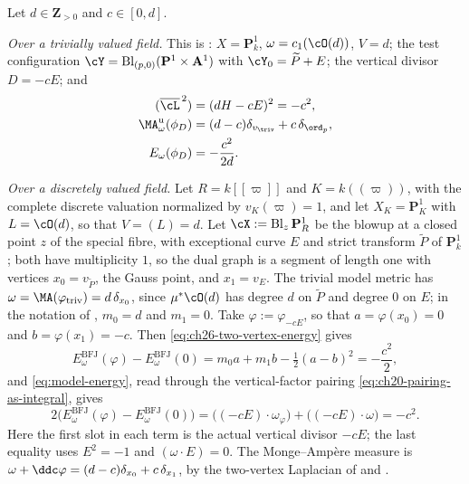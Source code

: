 \begin{example}
\label{ex:ch46-same-number-twice}
Let $d\in\mathbf Z_{>0}$ and $c\in[0,d]$.

\emph{Over a trivially valued field.}  This is
: $X=\mathbf P^1_k$, $\omega=c_1(\cO(d))$,
$V=d$; the test configuration
$\cY=\operatorname{Bl}_{(p,0)}(\mathbf P^1\times\mathbf A^1)$ with
$\cY_0=\widetilde P+E$; the vertical divisor $D=-cE$; and
\[
 \begin{aligned}
  (\overline\cL^{\,2})&=(dH-cE)^2=-c^2,\\
  \MA^{\mathrm u}_\omega(\phi_D)
    &=(d-c)\delta_{v_{\triv}}+c\,\delta_{\ord_p},\\
  E_\omega(\phi_D)&=-\frac{c^2}{2d}.
 \end{aligned}
\]

\emph{Over a discretely valued field.}  Let $R=k[[\varpi]]$ and $K=k((\varpi))$, with the complete discrete
valuation normalized by $v_K(\varpi)=1$,
and let $X_K=\mathbf P^1_K$ with $L=\cO(d)$, so that $V=(L)=d$.  Let
$\cX:=\operatorname{Bl}_z\mathbf P^1_R$ be the blowup at a closed point
$z$ of the special fibre, with exceptional curve $E$ and strict
transform $\widetilde P$ of $\mathbf P^1_k$; both have multiplicity
$1$, so the dual graph is a segment of length one with vertices
$x_0=v_{\widetilde P}$, the Gauss point, and $x_1=v_E$.  The trivial
model metric has
$\omega=\MA(\varphi_{\mathrm{triv}})=d\,\delta_{x_0}$, since
$\mu^*\cO(d)$ has degree $d$ on $\widetilde P$ and degree $0$ on
$E$; in the notation of , $m_0=d$ and
$m_1=0$.  Take $\varphi:=\varphi_{-cE}$, so that
$a=\varphi(x_0)=0$ and $b=\varphi(x_1)=-c$.  Then
\eqref{eq:ch26-two-vertex-energy} gives
\[
 E^{\mathrm{BFJ}}_\omega(\varphi)-E^{\mathrm{BFJ}}_\omega(0)
 =m_0a+m_1b-\tfrac12(a-b)^2
 =-\frac{c^2}{2},
\]
and \eqref{eq:model-energy}, read through the vertical-factor pairing
\eqref{eq:ch20-pairing-as-integral}, gives
\[
 2\bigl(E^{\mathrm{BFJ}}_\omega(\varphi)
        -E^{\mathrm{BFJ}}_\omega(0)\bigr)
 =\bigl((-cE)\cdot\omega_\varphi\bigr)
  +\bigl((-cE)\cdot\omega\bigr)
 =-c^2 .
\]
Here the first slot in each term is the actual vertical divisor $-cE$;
the last equality uses $E^2=-1$ and $(\omega\cdot E)=0$.
The Monge--Amp\`ere measure is
$\omega+\ddc\varphi=(d-c)\delta_{x_0}+c\,\delta_{x_1}$, by the
two-vertex Laplacian of  and
.


\end{example}
